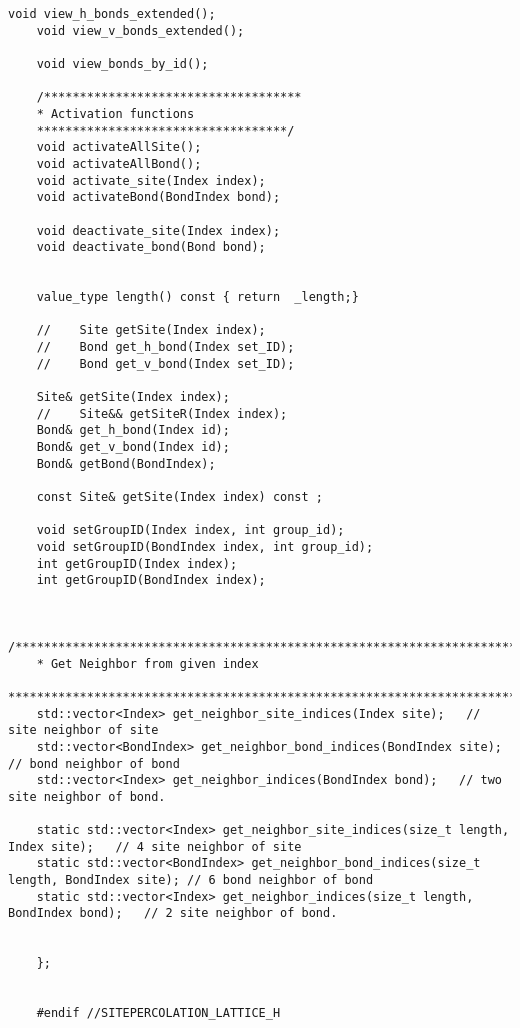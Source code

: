 \begin{lstlisting}[style=CStyle]
	void view_h_bonds_extended();
	void view_v_bonds_extended();
	
	void view_bonds_by_id();
	
	/************************************
	* Activation functions
	***********************************/
	void activateAllSite();
	void activateAllBond();
	void activate_site(Index index);
	void activateBond(BondIndex bond);
	
	void deactivate_site(Index index);
	void deactivate_bond(Bond bond);
	
	
	value_type length() const { return  _length;}
	
	//    Site getSite(Index index);
	//    Bond get_h_bond(Index set_ID);
	//    Bond get_v_bond(Index set_ID);
	
	Site& getSite(Index index);
	//    Site&& getSiteR(Index index);
	Bond& get_h_bond(Index id);
	Bond& get_v_bond(Index id);
	Bond& getBond(BondIndex);
	
	const Site& getSite(Index index) const ;
	
	void setGroupID(Index index, int group_id);
	void setGroupID(BondIndex index, int group_id);
	int getGroupID(Index index);
	int getGroupID(BondIndex index);
	
	
	/******************************************************************************
	* Get Neighbor from given index
	******************************************************************************/
	std::vector<Index> get_neighbor_site_indices(Index site);   // site neighbor of site
	std::vector<BondIndex> get_neighbor_bond_indices(BondIndex site); // bond neighbor of bond
	std::vector<Index> get_neighbor_indices(BondIndex bond);   // two site neighbor of bond.
	
	static std::vector<Index> get_neighbor_site_indices(size_t length, Index site);   // 4 site neighbor of site
	static std::vector<BondIndex> get_neighbor_bond_indices(size_t length, BondIndex site); // 6 bond neighbor of bond
	static std::vector<Index> get_neighbor_indices(size_t length, BondIndex bond);   // 2 site neighbor of bond.
	
	
	};
	
	
	#endif //SITEPERCOLATION_LATTICE_H

	\end{lstlisting}
	
